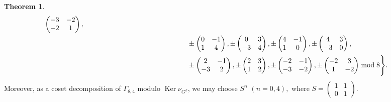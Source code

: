 \documentclass[12pt]{article}
\theoremstyle{definition}
\newtheorem{theorem}{Theorem}
\numberwithin{equation}{section}
\numberwithin{theorem}{section}
\newcommand{\Ker}{\operatorname{Ker}}
\begin{document}
\begin{theorem}
{\begin{align*}
\begin{pmatrix}
-3 & -2 \\
-2 & 1
\end{pmatrix}, \\
&\hspace{52mm}
\pm
\begin{pmatrix}
0 & -1 \\
1 & 4
\end{pmatrix}, 
\pm
\begin{pmatrix}
0 & 3 \\
-3 & 4
\end{pmatrix}, 
\pm
\begin{pmatrix}
4 & -1 \\
1 & 0
\end{pmatrix}, 
\pm
\begin{pmatrix}
4 & 3 \\
-3 & 0
\end{pmatrix},  \\
&\hspace{52mm}
\pm
\begin{pmatrix}
2 & -1 \\
-3 & 2
\end{pmatrix}, 
\pm
\begin{pmatrix}
2 & 3 \\
1 & 2
\end{pmatrix}, 
\pm
\begin{pmatrix}
-2 & -1 \\
-3 & -2
\end{pmatrix}, 
\pm
\begin{pmatrix}
-2 & 3 \\
1 & -2
\end{pmatrix} 
\bmod{8}
\Bigg\}.
\end{align*}
Moreover, 
as a coset decomposition of $\Gamma_{\theta,4}$ modulo $\Ker \nu_{G^{k}}$,  
we may choose $S^{n}$ $(n=0,4),$ where 
$
S=
\begin{pmatrix}
1 & 1 \\
0 & 1
\end{pmatrix}. 
$
}
\end{theorem}
\end{document}
